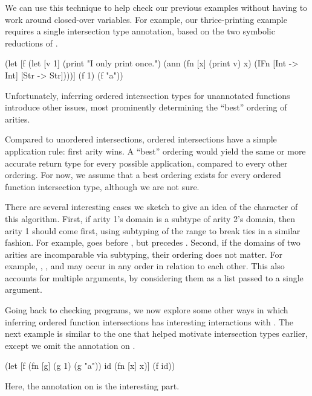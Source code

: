 We can use this technique to help check our previous examples
without having to work around closed-over variables.
For example, our thrice-printing example requires
a single intersection type annotation, based on
the two symbolic reductions of .

\begin{cljlisting}
(let [f (let [v 1]
          (print "I only print once.")
          (ann (fn [x] (print v) x)
               (IFn [Int -> Int]
                    [Str -> Str])))]
  (f 1)
  (f "a"))
\end{cljlisting}

Unfortunately, inferring ordered intersection types for unannotated
functions introduce other issues,
most prominently determining the ``best'' ordering of
arities.

Compared to unordered intersections, ordered intersections
have a simple application rule: first arity wins.
A ``best'' ordering would yield the same or more accurate return type
for every possible application, compared to every other ordering.
For now, we assume that a best ordering
exists for every ordered function intersection type, although
we are not sure.

There are several interesting cases we sketch to give an idea
of the character of this algorithm.
First, if arity 1's domain is a subtype of arity 2's
domain, then arity 1 should come first,
using subtyping of the range to break ties in a similar fashion.
For example, 
goes before  ,
but
precedes
.
Second, if the domains of two arities
are incomparable via subtyping, their ordering does not matter.
For example,
,
,
and
may occur in any order in relation to each other.
This also accounts for multiple arguments,
by considering them as a list passed to a single argument.

Going back to checking programs, we now explore some
other ways in which inferring ordered function intersections has
interesting interactions with \ltiFsub.
The next example is similar to the one that helped motivate
intersection types earlier, except we omit the annotation
on .

\begin{cljlisting}
(let [f (fn [g]
          (g 1)
          (g "a"))
      id (fn [x] x)]
  (f id))
\end{cljlisting}

Here, the annotation on  is the interesting part.

